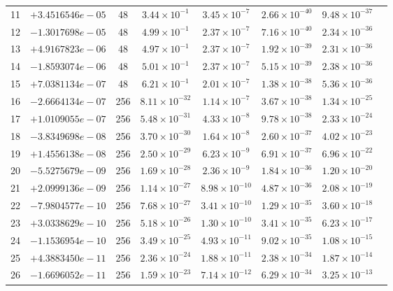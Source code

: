 \documentclass[11pt]{article}
\begin{document}
\begin{longtable}{rlcccccc}
11 & $+3.4516546e-05$ & 48 & $3.44 \times 10^{-1}$ & $3.45 \times 10^{-7}$ & $2.66 \times 10^{-40}$ & $9.48 \times 10^{-37}$ \\
12 & $-1.3017698e-05$ & 48 & $4.99 \times 10^{-1}$ & $2.37 \times 10^{-7}$ & $7.16 \times 10^{-40}$ & $2.34 \times 10^{-36}$ \\
13 & $+4.9167823e-06$ & 48 & $4.97 \times 10^{-1}$ & $2.37 \times 10^{-7}$ & $1.92 \times 10^{-39}$ & $2.31 \times 10^{-36}$ \\
14 & $-1.8593074e-06$ & 48 & $5.01 \times 10^{-1}$ & $2.37 \times 10^{-7}$ & $5.15 \times 10^{-39}$ & $2.38 \times 10^{-36}$ \\
15 & $+7.0381134e-07$ & 48 & $6.21 \times 10^{-1}$ & $2.01 \times 10^{-7}$ & $1.38 \times 10^{-38}$ & $5.36 \times 10^{-36}$ \\
\midrule
16 & $-2.6664134e-07$ & 256 & $8.11 \times 10^{-32}$ & $1.14 \times 10^{-7}$ & $3.67 \times 10^{-38}$ & $1.34 \times 10^{-25}$ \\
17 & $+1.0109055e-07$ & 256 & $5.48 \times 10^{-31}$ & $4.33 \times 10^{-8}$ & $9.78 \times 10^{-38}$ & $2.33 \times 10^{-24}$ \\
18 & $-3.8349698e-08$ & 256 & $3.70 \times 10^{-30}$ & $1.64 \times 10^{-8}$ & $2.60 \times 10^{-37}$ & $4.02 \times 10^{-23}$ \\
19 & $+1.4556138e-08$ & 256 & $2.50 \times 10^{-29}$ & $6.23 \times 10^{-9}$ & $6.91 \times 10^{-37}$ & $6.96 \times 10^{-22}$ \\
20 & $-5.5275679e-09$ & 256 & $1.69 \times 10^{-28}$ & $2.36 \times 10^{-9}$ & $1.84 \times 10^{-36}$ & $1.20 \times 10^{-20}$ \\
21 & $+2.0999136e-09$ & 256 & $1.14 \times 10^{-27}$ & $8.98 \times 10^{-10}$ & $4.87 \times 10^{-36}$ & $2.08 \times 10^{-19}$ \\
22 & $-7.9804577e-10$ & 256 & $7.68 \times 10^{-27}$ & $3.41 \times 10^{-10}$ & $1.29 \times 10^{-35}$ & $3.60 \times 10^{-18}$ \\
23 & $+3.0338629e-10$ & 256 & $5.18 \times 10^{-26}$ & $1.30 \times 10^{-10}$ & $3.41 \times 10^{-35}$ & $6.23 \times 10^{-17}$ \\
24 & $-1.1536954e-10$ & 256 & $3.49 \times 10^{-25}$ & $4.93 \times 10^{-11}$ & $9.02 \times 10^{-35}$ & $1.08 \times 10^{-15}$ \\
25 & $+4.3883450e-11$ & 256 & $2.36 \times 10^{-24}$ & $1.88 \times 10^{-11}$ & $2.38 \times 10^{-34}$ & $1.87 \times 10^{-14}$ \\
26 & $-1.6696052e-11$ & 256 & $1.59 \times 10^{-23}$ & $7.14 \times 10^{-12}$ & $6.29 \times 10^{-34}$ & $3.25 \times 10^{-13}$ \\

\end{longtable}
\end{document}
